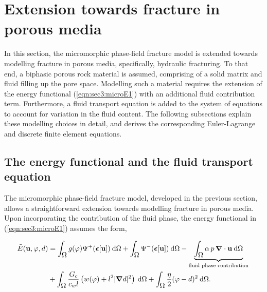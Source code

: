 \documentclass[11pt]{article}
\begin{document}
\section{Extension towards fracture in porous media}\label{sec:porousFracture}

In this section, the micromorphic phase-field fracture model is extended towards modelling fracture in porous media, specifically, hydraulic fracturing. To that end, a biphasic porous rock material is assumed, comprising of a solid matrix and fluid filling up the pore space. Modelling such a material requires the extension of the energy functional (\ref{eqn:sec3:microE1}) with an additional fluid contribution term. Furthermore, a fluid transport equation is added to the system of equations to account for variation in the fluid content. The following subsections explain these modelling choices in detail, and derives the corresponding Euler-Lagrange and discrete finite element equations.



\subsection{The energy functional and the fluid transport equation}\label{sec:hydfracEFuncTransport}

The micromorphic phase-field fracture model, developed in the previous section, allows a straightforward extension towards modelling fracture in porous media. Upon incorporating the contribution of the fluid phase, the energy functional in (\ref{eqn:sec3:microE1}) assumes the form,


\begin{align}
\Tilde{E}(\hbox{$\mathbf{u}$},\hbox{$\varphi$},\hbox{$d$}) & = \int_{\hbox{$\Omega$}}^{} g(\hbox{$\varphi$}) \Psi^+(\hbox{$\hbox{\boldmath$\epsilon$}$}[\hbox{$\mathbf{u}$}]) \: \text{d}\hbox{$\Omega$} + \int_{\hbox{$\Omega$}}^{} \Psi^-(\hbox{$\hbox{\boldmath$\epsilon$}$}[\hbox{$\mathbf{u}$}]) \: \text{d}\hbox{$\Omega$} - \underbrace{\int_{\hbox{$\Omega$}}^{}  \alpha \, p \, \hbox{\boldmath$\nabla$} \cdot \hbox{$\mathbf{u}$} \: \text{d}\hbox{$\Omega$}}_{\text{fluid phase contribution}}  {\label{eqn:sec4:microEPorous}} \\ 
& + \int_{\hbox{$\Omega$}}^{} \dfrac{\hbox{$G_c$}}{c_w \hbox{$l$}} \left( w(\hbox{$\varphi$}) + \hbox{$l$}^2 |\hbox{\boldmath$\nabla$} \hbox{$d$}|^2 \right) \: \text{d}\hbox{$\Omega$} + \int_{\hbox{$\Omega$}}^{} \frac{\eta}{2} (\hbox{$\varphi$}-\hbox{$d$})^2 \: \text{d}\hbox{$\Omega$}. \nonumber
\end{align}
\end{document}
